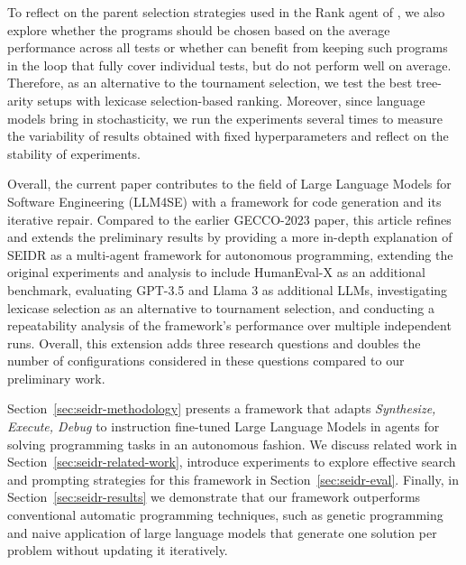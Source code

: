 To reflect on the parent selection strategies used in the Rank agent of \method{}, we also explore whether the programs should be chosen based on the average performance across all tests or whether \method{} can benefit from keeping such programs in the loop that fully cover individual tests, but do not perform well on average.
Therefore, as an alternative to the tournament selection, we test the best tree-arity setups with lexicase selection-based ranking.
Moreover, since language models bring in stochasticity, we run the experiments several times to measure the variability of results obtained with fixed hyperparameters and reflect on the stability of experiments.

Overall, the current paper contributes to the field of Large Language Models for Software Engineering (LLM4SE) with a framework for code generation and its iterative repair. 
Compared to the earlier GECCO-2023 paper, this article refines and extends the preliminary results by providing a more in-depth explanation of SEIDR as a multi-agent framework for autonomous programming, extending the original experiments and analysis to include HumanEval-X as an additional benchmark, evaluating GPT-3.5 and Llama 3 as additional LLMs, investigating lexicase selection as an alternative to tournament selection, and conducting a repeatability analysis of the framework’s performance over multiple independent runs. Overall, this extension adds three research questions and doubles the number of configurations considered in these questions compared to our preliminary work. 

Section~\ref{sec:seidr-methodology} presents a framework that adapts \emph{Synthesize, Execute, Debug} to instruction fine-tuned Large Language Models in agents for solving programming tasks in an autonomous fashion. 
We discuss related work in Section~\ref{sec:seidr-related-work}, introduce experiments to explore effective search and prompting strategies for this framework in Section~\ref{sec:seidr-eval}. 
Finally, in Section~\ref{sec:seidr-results} we demonstrate that our framework outperforms conventional automatic programming techniques, such as genetic programming and naive application of large language models that generate one solution per problem without updating it iteratively. 

